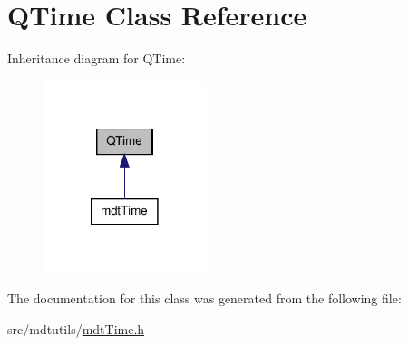 \hypertarget{class_q_time}{\section{Q\-Time Class Reference}
\label{class_q_time}
}


Inheritance diagram for Q\-Time\-:\nopagebreak
\begin{figure}[H]
\begin{center}
\leavevmode
\includegraphics[width=134pt]{class_q_time__inherit__graph}
\end{center}
\end{figure}


The documentation for this class was generated from the following file\-:\begin{DoxyCompactItemize}
\item 
src/mdtutils/\hyperlink{mdt_time_8h}{mdt\-Time.\-h}\end{DoxyCompactItemize}

